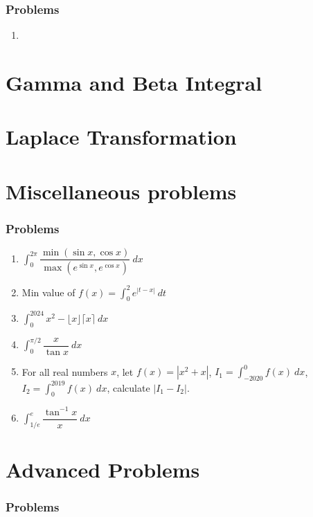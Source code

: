 \documentclass[12pt,a4paper,twoside]{book}
\newcommand{\dint}[1]{\displaystyle{\int #1 \  dx}}
\begin{document}
	\subsubsection{Problems}
	\begin{enumerate}
	\item 
	\end{enumerate}
	
\section{Gamma and Beta Integral}
\section{Laplace Transformation}
\section{Miscellaneous problems}
	\subsubsection{Problems}
	\begin{enumerate}
	\item $\dint{_0^{2\pi} \dfrac{\min{(\sin x, \cos x)}}{\max{(e^{\sin x}, e^{\cos x})}}}$
	\item Min value of $\displaystyle{f(x)=\int_0^2e^{|t-x|}\ dt}$
	\item $\dint{_0^{2024} x^2-\lfloor x\rfloor \lceil x \rceil }$
	\item $\dint{_0^{\pi/2}\dfrac{x}{\tan x}}$
	\item For all real numbers $x$, let $f(x) = |x^2+x|$, $I_1=\dint{_{-2020}^0 f(x)}$, $I_2=\dint{_0^{2019} f(x)}$, calculate $|I_1-I_2|$.
	\item $\dint{_{1/e}^e \dfrac{\tan^{-1}x}{x}}$
	\end{enumerate}
	
	
	\section{Advanced Problems}
	\subsubsection{Problems}
\end{document}
